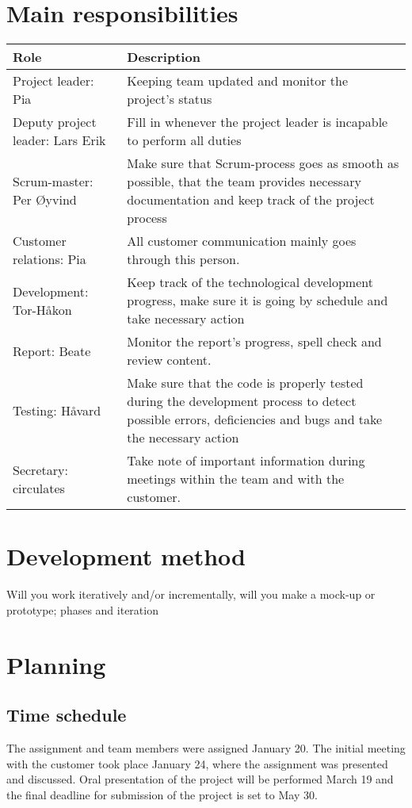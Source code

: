 \section{Main responsibilities}
\begin{table}[H]
\begin{tabular}{l|p{7cm}}
\textbf{Role} & \textbf{Description}\\\hline
Project leader: Pia & Keeping team updated and monitor the project's status\\\hline
Deputy project leader: Lars Erik & Fill in whenever the project leader is incapable to perform all duties\\\hline
Scrum-master: Per Øyvind & Make sure that Scrum-process goes as smooth as possible, that the team provides necessary documentation and keep track of the project process\\\hline
Customer relations: Pia & All customer communication mainly goes through this person.\\\hline
Development: Tor-Håkon & Keep track of the technological development progress, make sure it is going by schedule and take necessary action \\\hline
Report: Beate & Monitor the report's progress, spell check and review content.\\\hline
Testing: Håvard & Make sure that the code is properly tested during the development process to detect possible errors, deficiencies and bugs and take the necessary action \\\hline
Secretary: circulates & Take note of important information during meetings within the team and with the customer.
\end{tabular}
\end{table}

\section{Development method}
Will you work iteratively and/or incrementally, will you make a 
mock-up or prototype; phases and iteration

\section{Planning}
\subsection{Time schedule}
The assignment and team members were assigned January 20. The initial meeting with the customer took place January 24, where the assignment was presented and discussed. Oral presentation of the project will be performed March 19 and the final deadline for submission of the project is set to May 30.

